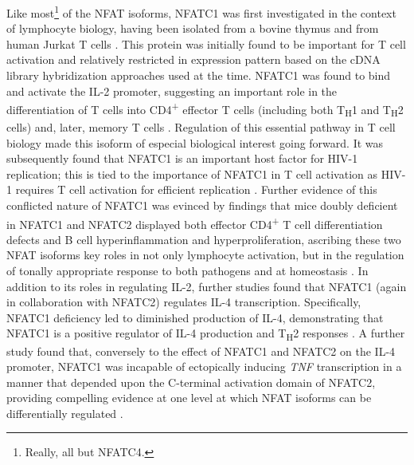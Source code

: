 Like most\footnote{Really, all but NFATC4.} of the NFAT isoforms, NFATC1 was first investigated in the context of lymphocyte biology, having been isolated from a bovine thymus and from human Jurkat T cells \citep{Northrop1994}. This protein was initially found to be important for T cell activation and relatively restricted in expression pattern based on the cDNA library hybridization approaches used at the time. NFATC1 was found to bind and activate the IL\hyp{}2 promoter, suggesting an important role in the differentiation of T cells into CD4\textsuperscript{+} effector T cells (including both T\textsubscript{H}1 and T\textsubscript{H}2 cells) and, later, memory T cells \citep{Martinez2015, Monticelli2002, YahiaCherbal2019, Torgerson2009, KleinHessling2017, Oestreich2008}. Regulation of this essential pathway in T cell biology made this isoform of especial biological interest going forward. It was subsequently found that NFATC1 is an important host factor for HIV\hyp{}1 replication; this is tied to the importance of NFATC1 in T cell activation as HIV\hyp{}1 requires T cell activation for efficient replication \citep{Kinoshita1997}. Further evidence of this conflicted nature of NFATC1 was evinced by findings that mice doubly deficient in NFATC1 and NFATC2 displayed both effector CD4\textsuperscript{+} T cell differentiation defects and B cell hyperinflammation and hyperproliferation, ascribing these two NFAT isoforms key roles in not only lymphocyte activation, but in the regulation of tonally appropriate response to both pathogens and at homeostasis \citep{Peng2001}. In addition to its roles in regulating IL\hyp{}2, further studies found that NFATC1 (again in collaboration with NFATC2) regulates IL\hyp{}4 transcription. Specifically, NFATC1 deficiency led to diminished production of IL\hyp{}4, demonstrating that NFATC1 is a positive regulator of IL\hyp{}4 production and T\textsubscript{H}2 responses \citep{Monticelli2002}. A further study found that, conversely to the effect of NFATC1 and NFATC2 on the IL\hyp{}4 promoter, NFATC1 was incapable of ectopically inducing \textit{TNF} transcription in a manner that depended upon the C\hyp{}terminal activation domain of NFATC2, providing compelling evidence at one level at which NFAT isoforms can be differentially regulated \citep{Kaminuma2008}.

